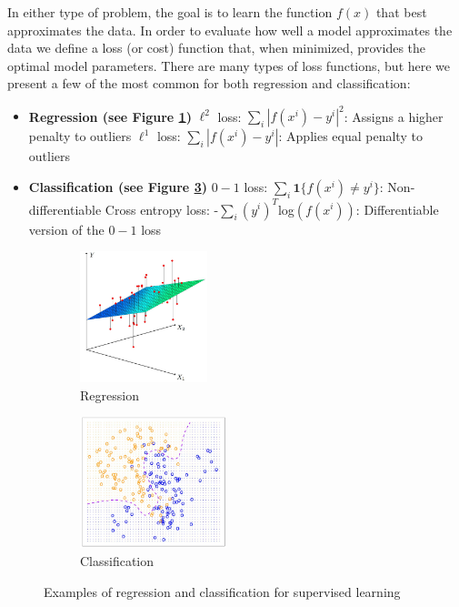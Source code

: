 \documentclass[twoside]{article}
\begin{document}
In either type of problem, the goal is to learn the function $f(x)$ that best approximates the data. In order to evaluate how well a model approximates the data we define a loss (or cost) function that, when minimized, provides the optimal model parameters. There are many types of loss functions, but here we present a few of the most common for both regression and classification:

\begin{itemize}
\item \textbf{Regression (see Figure \ref{fig:regression_example})} \newline
\indent $\ell^2$ loss: $\sum_{i}|f(x^i) - y^i|^2$: Assigns a higher penalty to outliers \newline
\indent $\ell^1$ loss: $\sum_{i}|f(x^i) - y^i|$: Applies equal penalty to outliers 

\item \textbf{Classification (see Figure \ref{fig:classification_example})}\newline
\indent $0 - 1$ loss: $\sum_{i}\textbf{1}\{f(x^i)\neq y^i\}$: Non-differentiable \newline
\indent Cross entropy loss: -$\sum_{i}(y^i)^T$log$(f(x^i))$: Differentiable version of the $0 - 1$ loss
\end{itemize}

\begin{figure}[H]
	\centering
    \begin{subfigure}{0.45\linewidth}
    	\includegraphics[height=1.5in]{pics/lecture_8_regression.jpg}
        \caption{Regression}
        \label{fig:regression_example}
    \end{subfigure}
    \begin{subfigure}{0.45\linewidth}
    	\includegraphics[height=1.5in]{pics/lecture_8_classification.jpg}
        \caption{Classification}
        \label{fig:classification_example}
    \end{subfigure}
    \caption{Examples of regression and classification for supervised learning}
\end{figure}
\end{document}
